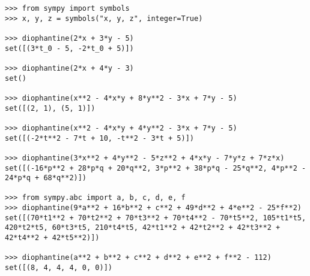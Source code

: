\begin{verbatim}
>>> from sympy import symbols
>>> x, y, z = symbols("x, y, z", integer=True)

>>> diophantine(2*x + 3*y - 5)
set([(3*t_0 - 5, -2*t_0 + 5)])

>>> diophantine(2*x + 4*y - 3)
set()

>>> diophantine(x**2 - 4*x*y + 8*y**2 - 3*x + 7*y - 5)
set([(2, 1), (5, 1)])

>>> diophantine(x**2 - 4*x*y + 4*y**2 - 3*x + 7*y - 5)
set([(-2*t**2 - 7*t + 10, -t**2 - 3*t + 5)])

>>> diophantine(3*x**2 + 4*y**2 - 5*z**2 + 4*x*y - 7*y*z + 7*z*x)
set([(-16*p**2 + 28*p*q + 20*q**2, 3*p**2 + 38*p*q - 25*q**2, 4*p**2 - 24*p*q + 68*q**2)])

>>> from sympy.abc import a, b, c, d, e, f
>>> diophantine(9*a**2 + 16*b**2 + c**2 + 49*d**2 + 4*e**2 - 25*f**2)
set([(70*t1**2 + 70*t2**2 + 70*t3**2 + 70*t4**2 - 70*t5**2, 105*t1*t5, 420*t2*t5, 60*t3*t5, 210*t4*t5, 42*t1**2 + 42*t2**2 + 42*t3**2 + 42*t4**2 + 42*t5**2)])

>>> diophantine(a**2 + b**2 + c**2 + d**2 + e**2 + f**2 - 112)
set([(8, 4, 4, 4, 0, 0)])
\end{verbatim}
